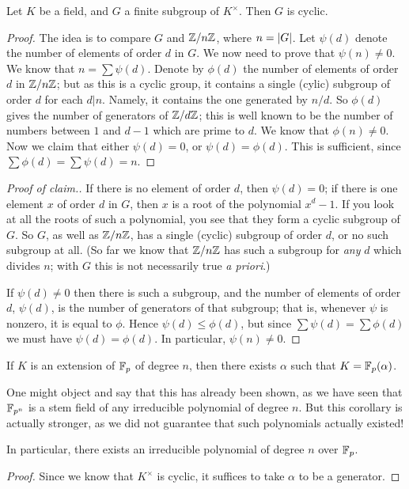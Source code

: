 \begin{thm}
Let $K$ be a field, and $G$ a finite subgroup of $K^\times$. Then $G$ is cyclic.
\end{thm}
\begin{proof}
The idea is to compare $G$ and $\mathbb{Z}/n\mathbb{Z}$, where $n = \left|G\right|$. 
Let $\psi(d)$ denote the number of elements of order $d$ in $G$. 
We now need to prove that $\psi(n) \neq 0$. 
We know that $n = \sum \psi(d)$. 
Denote by $\phi(d)$ the number of elements of order $d$ in $\mathbb{Z}/n\mathbb{Z}$; but as this is a cyclic group, it contains a single (cylic) subgroup of order $d$ for each $d|n$. 
Namely, it contains the one generated by $n/d$. 
So $\phi(d)$ gives the number of generators of $\mathbb{Z}/d\mathbb{Z}$; this is well known to be the number of numbers between $1$ and $d - 1$ which are prime to $d$. 
We know that $\phi(n) \neq 0$. 
Now we claim that either $\psi(d) = 0$, or $\psi(d) = \phi(d)$. 
This is sufficient, since $\sum \phi(d) = \sum \psi(d) = n$.
\end{proof}
\begin{proof}[Proof of claim.]
If there is no element of order $d$, then $\psi(d) = 0$; if there is one element $x$ of order $d$ in $G$, then $x$ is a root of the polynomial $x^d - 1$.
If you look at all the roots of such a polynomial, you see that they form a cyclic subgroup of $G$. 
So $G$, as well as $\mathbb{Z}/n\mathbb{Z}$, has a single (cyclic) subgroup of order $d$, or no such subgroup at all.
(So far we know that $\mathbb{Z}/n\mathbb{Z}$ has such a subgroup for \emph{any} $d$ which divides $n$; with $G$ this is not necessarily true \emph{a priori}.) 

If $\psi(d) \neq 0$ then there is such a subgroup, and the number of elements of order $d$, $\psi(d)$, is the number of generators of that subgroup; that is, whenever $\psi$ is nonzero, it is equal to $\phi$. 
Hence $\psi(d) \leq \phi(d)$, but since $\sum \psi(d) = \sum \phi(d)$ we must have $\psi(d) = \phi(d)$. 
In particular, $\psi(n) \neq 0$.
\end{proof}

\begin{cor}
If $K$ is an extension of $\mathbb{F}_p$ of degree $n$, then there exists $\alpha$ such that $K = \mathbb{F}_p(\alpha)$. 
\end{cor}
One might object and say that this has already been shown, as we have seen that $\mathbb{F}_{p^n}$ is a stem field of any irreducible polynomial of degree $n$.
But this corollary is actually stronger, as we did not guarantee that such polynomials actually existed!
\begin{cor*}[contd.]
In particular, there exists an irreducible polynomial of degree $n$ over $\mathbb{F}_p$.
\end{cor*}
\begin{proof}
Since we know that $K^\times$ is cyclic, it suffices to take $\alpha$ to be a generator.
\end{proof}

